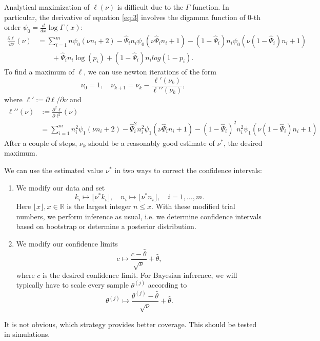 \documentclass[a4paper,11pt]{scrartcl}
\def\p{\partial}
\begin{document}
Analytical maximization of $\ell ( \nu)$ is difficult due to the $\Gamma$ function.
In particular, the derivative of equation \eqref{eq:3} involves the digamma function of 0-th order $\psi_0 = \frac{d}{dx} \log\Gamma(x)$:
%
\begin{equation}
    \begin{split}
        \frac{\p\ell}{\p \nu} (\nu) &= \sum_{i=1}^m n\psi_0 ( \nu n_i + 2 )
            - \hat{\Psi}_i n_i \psi_0 ( \nu \hat{\Psi}_i n_i + 1)
            - (1-\hat{\Psi}_i) n_i \psi_0 ( \nu (1-\hat{\Psi}_i) n_i + 1) \\
            &\qquad + \hat{\Psi}_i n_i \log (p_i) + (1-\hat{\Psi}_i) n_i log (1-p_i).
    \end{split}
    \label{eq:4}
\end{equation}
%
To find a maximum of $\ell$, we can use newton iterations of the form
%
$$
\nu_0=1,\quad\nu_{k+1} = \nu_{k} - \frac{\ell\prime(\nu_k)}{\ell\prime\prime(\nu_k)},
$$
%
where $\ell\prime := \p\ell/\p\nu$ and
%
\begin{equation}
    \begin{split}
        \ell\prime\prime ( \nu ) &:= \frac{\p^2\ell}{\p\ell^2} ( \nu) \\
        &= \sum_{i=1}^m n_i^2 \psi_1 ( \nu n_i + 2 ) - \hat{\Psi}_i^2 n_i^2 \psi_1 ( \nu \hat{\Psi}_i n_i + 1 ) - (1-\hat{\Psi}_i)^2 n_i^2 \psi_1 ( \nu (1-\hat{\Psi}_i) n_i + 1 )
    \end{split}
    \label{eq:5}
\end{equation}
%
After a couple of steps, $\nu_k$ should be a reasonably good estimate of $\nu^*$, the desired maximum.

We can use the estimated value $\nu^*$ in two ways to correct the confidence intervals:
%
\begin{enumerate}
    \item We modify our data and set
        $$
        k_i\mapsto \lfloor\nu^* k_i\rfloor,\quad n_i\mapsto \lfloor\nu^* n_i\rfloor,\quad i=1,\dots,m.
        $$
        Here $\lfloor x\rfloor, x\in\mathbb{R}$ is the largest integer $n\leq x$.
        With these modified trial numbers, we perform inference as usual, i.e. we determine confidence intervals based on bootstrap or determine
        a posterior distribution.
    \item We modify our confidence limits
        $$
        c \mapsto \frac{c-\hat{\theta}}{\sqrt{\nu}} + \hat{\theta},
        $$
        where $c$ is the desired confidence limit.
        For Bayesian inference, we will typically have to scale every sample $\theta^{(j)}$ according to
        $$
        \theta^{(j)} \mapsto \frac{\theta^{(j)} - \hat{\theta}}{\sqrt{\nu}} + \hat{\theta}.
        $$
\end{enumerate}
%
It is not obvious, which strategy provides better coverage.
This should be tested in simulations.
\end{document}

